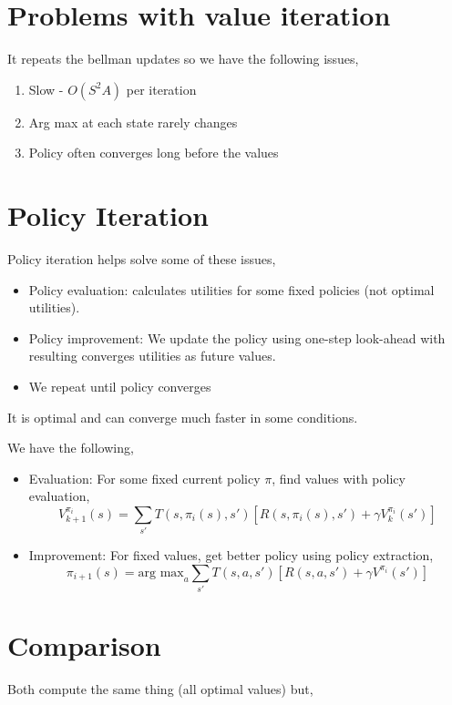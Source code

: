 \section{Problems with value iteration}
It repeats the bellman updates so we have the following issues, 
\begin{enumerate}
    \item Slow - $O(S^2A)$ per iteration
    \item Arg max at each state rarely changes
    \item Policy often converges long before the values
\end{enumerate}
\section{Policy Iteration}

Policy iteration helps solve some of these issues, 
\begin{itemize}
    \item Policy evaluation: calculates utilities for some fixed policies (not optimal utilities).
    \item Policy improvement: We update the policy using one-step look-ahead with resulting converges utilities as future values. 
    \item We repeat until policy converges
\end{itemize}


It is optimal and can converge much faster in some conditions.

We have the following, 
\begin{itemize}
    \item Evaluation: For some fixed current policy $\pi$, find values with policy evaluation, 
        $$ V_{k + 1}^{\pi_i}(s) = \sum_{s'} T(s, \pi_i(s), s')[ R(s, \pi_i(s), s') + \gamma V_k^{\pi_i}(s')] $$ 
    \item Improvement: For fixed values, get better policy using policy extraction,
        $$ \pi_{i + 1}(s) = \text{arg max}_a \sum_{s'} T(s, a, s') [R(s, a, s') + \gamma V^{\pi_i}(s')] $$ 
\end{itemize}


\section{Comparison}
Both compute the same thing (all optimal values) but, 

\vspace{1em}

